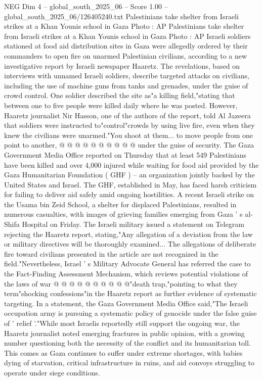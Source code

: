 \begin{textsample}{NEG Dim 4 – global\_south\_2025\_06 – Score 1.00 – global\_south\_2025\_06/126405240.txt}  \label{ex:f4_neg_103}
Palestinians take shelter from Israeli strikes at a Khan Younis school in Gaza Photo : AP Palestinians take shelter from Israeli strikes at a Khan Younis school in Gaza Photo : AP Israeli soldiers stationed at food aid distribution sites in Gaza were allegedly ordered by their commanders to open fire on unarmed Palestinian civilians, according to a new investigative report by Israeli newspaper Haaretz.
The revelations, based on interviews with unnamed Israeli soldiers, describe targeted attacks on civilians, including the use of machine guns from tanks and grenades, under the guise of crowd control.
One soldier described the site as"a killing field,"stating that between one to five people were killed daily where he was posted.
However, Haaretz journalist Nir Hasson, one of the authors of the report, told Al Jazeera that soldiers were instructed to"control"crowds by using live fire, even when they knew the civilians were unarmed."You shoot at them... to move people from one point to another, @ @ @ @ @ @ @ @ @ @ under the guise of security.
The Gaza Government Media Office reported on Thursday that at least 549 Palestinians have been killed and over 4,000 injured while waiting for food aid provided by the Gaza Humanitarian Foundation ( GHF ) -- an organization jointly backed by the United States and Israel.
The GHF, established in May, has faced harsh criticism for failing to deliver aid safely amid ongoing hostilities.
A recent Israeli strike on the Usama bin Zeid School, a shelter for displaced Palestinians, resulted in numerous casualties, with images of grieving families emerging from Gaza ' s al-Shifa Hospital on Friday.
The Israeli military issued a statement on Telegram rejecting the Haaretz report, stating,"Any allegation of a deviation from the law or military directives will be thoroughly examined...
The allegations of deliberate fire toward civilians presented in the article are not recognized in the field."Nevertheless, Israel ' s Military Advocate General has referred the case to the Fact-Finding Assessment Mechanism, which reviews potential violations of the laws of war @ @ @ @ @ @ @ @ @ @"death trap,"pointing to what they term"shocking confessions"in the Haaretz report as further evidence of systematic targeting.
In a statement, the Gaza Government Media Office said,"The Israeli occupation army is pursuing a systematic policy of genocide under the false guise of ' relief '."While most Israelis reportedly still support the ongoing war, the Haaretz journalist noted emerging fractures in public opinion, with a growing number questioning both the necessity of the conflict and its humanitarian toll.
This comes as Gaza continues to suffer under extreme shortages, with babies dying of starvation, critical infrastructure in ruins, and aid convoys struggling to operate under siege conditions.

\end{textsample}
